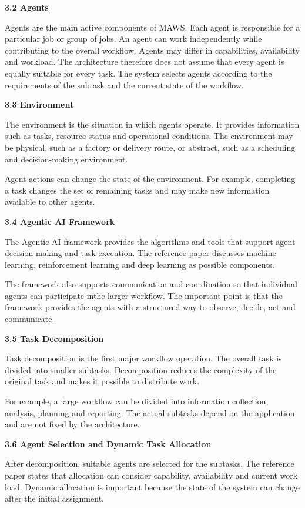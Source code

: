\documentclass[12pt,letterpaper]{article}
\newcommand{\sectiontitle}[1]{%
  \vspace{6pt}%
  {\noindent\fontsize{13.2pt}{16pt}\selectfont\bfseries #1\par}%
  \vspace{2pt}%
}
\begin{document}
\sectiontitle{3.2 Agents}
Agents are the main active components of MAWS. Each agent is responsible for a particular job or group of jobs. An agent can work independently while contributing to the overall workflow. Agents may differ in capabilities, availability and workload. The architecture therefore does not assume that every agent is equally suitable for every task. The system selects agents according to the requirements of the subtask and the current state of the workflow.

\sectiontitle{3.3 Environment}
The environment is the situation in which agents operate. It provides information such as tasks, resource status and operational conditions. The environment may be physical, such as a factory or delivery route, or abstract, such as a scheduling and decision-making environment.

Agent actions can change the state of the environment. For example, completing a task changes the set of remaining tasks and may make new information available to other agents.

\sectiontitle{3.4 Agentic AI Framework}
The Agentic AI framework provides the algorithms and tools that support agent decision-making and task execution. The reference paper discusses machine learning, reinforcement learning and deep learning as possible components.
\newpage

The framework also supports communication and coordination so that individual agents can participate inthe larger workflow. The important point is that the framework provides the agents with a structured way to observe, decide, act and communicate.

\sectiontitle{3.5 Task Decomposition}
Task decomposition is the first major workflow operation. The overall task is divided into smaller subtasks. Decomposition reduces the complexity of the original task and makes it possible to distribute work.

For example, a large workflow can be divided into information collection, analysis, planning and reporting. The actual subtasks depend on the application and are not fixed by the architecture.

\sectiontitle{3.6 Agent Selection and Dynamic Task Allocation}
After decomposition, suitable agents are selected for the subtasks. The reference paper states that allocation can consider capability, availability and current work load. Dynamic allocation is important because the state of the system can change after the initial assignment.
\end{document}
